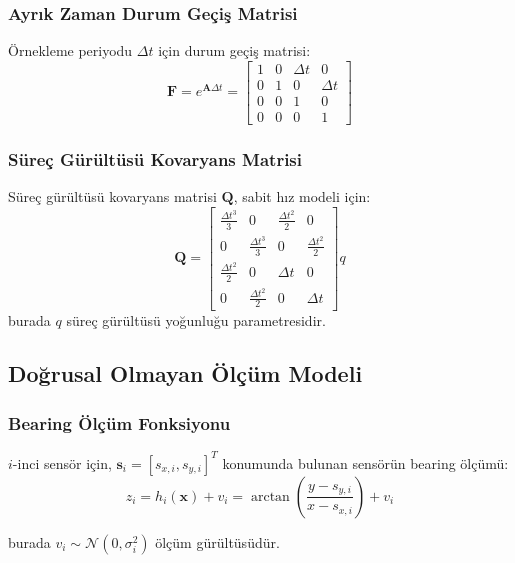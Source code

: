 \documentclass[12pt,a4paper]{article}
\begin{document}
\subsubsection{Ayrık Zaman Durum Geçiş Matrisi}
Örnekleme periyodu $\Delta t$ için durum geçiş matrisi:
\begin{equation}
\mathbf{F} = e^{\mathbf{A}\Delta t} = \begin{bmatrix}
1 & 0 & \Delta t & 0 \\
0 & 1 & 0 & \Delta t \\
0 & 0 & 1 & 0 \\
0 & 0 & 0 & 1
\end{bmatrix}
\end{equation}

\subsubsection{Süreç Gürültüsü Kovaryans Matrisi}
Süreç gürültüsü kovaryans matrisi $\mathbf{Q}$, sabit hız modeli için:
\begin{equation}
\mathbf{Q} = \begin{bmatrix}
\frac{\Delta t^3}{3} & 0 & \frac{\Delta t^2}{2} & 0 \\
0 & \frac{\Delta t^3}{3} & 0 & \frac{\Delta t^2}{2} \\
\frac{\Delta t^2}{2} & 0 & \Delta t & 0 \\
0 & \frac{\Delta t^2}{2} & 0 & \Delta t
\end{bmatrix} q
\end{equation}
burada $q$ süreç gürültüsü yoğunluğu parametresidir.

\subsection{Doğrusal Olmayan Ölçüm Modeli}

\subsubsection{Bearing Ölçüm Fonksiyonu}
$i$-inci sensör için, $\mathbf{s}_i = [s_{x,i}, s_{y,i}]^T$ konumunda bulunan sensörün bearing ölçümü:
\begin{equation}
z_i = h_i(\mathbf{x}) + v_i = \arctan\left(\frac{y - s_{y,i}}{x - s_{x,i}}\right) + v_i
\label{eq:bearing_measurement}
\end{equation}

burada $v_i \sim \mathcal{N}(0, \sigma_i^2)$ ölçüm gürültüsüdür.
\end{document}
